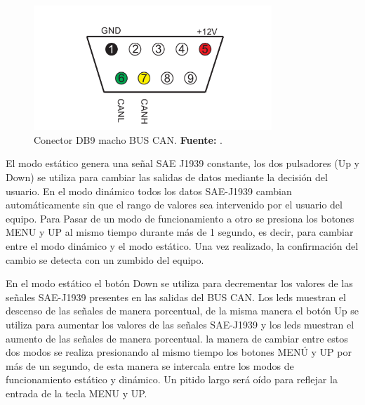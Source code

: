 \begin{figure}[H]
	\centering
		\includegraphics[width=0.8\textwidth]{./Cap6imagen/SimDb9.pdf}
	\caption[Conector DB9 macho BUS CAN.]{Conector DB9 macho BUS CAN.\textbf{ Fuente:} \cite{UserM}.}
	\label{DB9} %
\end{figure}

El modo estático genera una señal SAE J1939 constante, los  dos pulsadores (Up y Down) se utiliza para cambiar las salidas de datos mediante la decisión del usuario. En el modo dinámico todos los datos SAE-J1939 cambian automáticamente sin que el rango de valores sea intervenido por el usuario del equipo. Para Pasar de un modo de funcionamiento a otro se presiona los botones MENU y UP al mismo tiempo durante más de 1 segundo, es decir, para cambiar entre el modo dinámico y el modo estático. Una vez realizado, la confirmación del cambio se detecta con un zumbido del equipo.

En el modo estático el botón Down se utiliza para decrementar los valores de las señales SAE-J1939 presentes en las salidas del BUS CAN. Los leds muestran el descenso de las señales de manera porcentual, de la misma manera el botón Up se utiliza para aumentar los valores de las señales SAE-J1939 y los leds muestran el aumento de las señales de manera porcentual. la manera de cambiar entre estos dos modos se realiza presionando al mismo tiempo los botones MENÚ y UP por más de un segundo, de esta manera se intercala entre los modos de funcionamiento estático y dinámico. Un pitido largo será oído para reflejar la entrada de la tecla MENU y UP.

